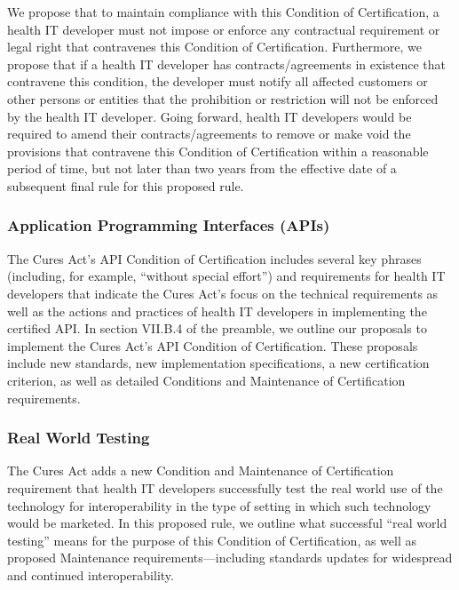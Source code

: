 \documentclass[twoside,11pt]{article}
\begin{document}
          We propose that to maintain compliance with this Condition of Certification, a health IT developer must not impose or enforce any contractual requirement or legal right that contravenes this Condition of Certification. Furthermore, we propose that if a health IT developer has contracts/agreements in existence that contravene this condition, the developer must notify all affected customers or other persons or entities that the prohibition or restriction will not be enforced by the health IT developer. Going forward, health IT developers would be required to amend their contracts/agreements to remove or make void the provisions that contravene this Condition of Certification within a reasonable period of time, but not later than two years from the effective date of a subsequent final rule for this proposed rule.


          \subsubsection{Application Programming Interfaces (APIs)}

          The Cures Act's API Condition of Certification includes several key phrases (including, for example, “without special effort”) and requirements for health IT developers that indicate the Cures Act's focus on the technical requirements as well as the actions and practices of health IT developers in implementing the certified API. In section VII.B.4 of the preamble, we outline our proposals to implement the Cures Act's API Condition of Certification. These proposals include new standards, new implementation specifications, a new certification criterion, as well as detailed Conditions and Maintenance of Certification requirements.


          \subsubsection{Real World Testing}

          The Cures Act adds a new Condition and Maintenance of Certification requirement that health IT developers successfully test the real world use of the technology for interoperability in the type of setting in which such technology would be marketed. In this proposed rule, we outline what successful “real world testing” means for the purpose of this Condition of Certification, as well as proposed Maintenance requirements—including standards updates for widespread and continued interoperability.
\end{document}
